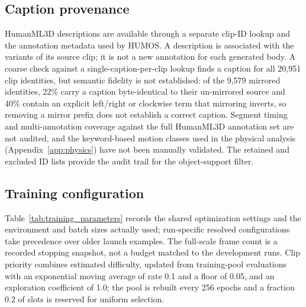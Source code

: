 \subsection{Caption provenance}\label{app:captions}

HumanML3D descriptions are available through a separate clip-ID lookup and the
annotation metadata used by HUMOS. A description is associated with the
variants of its source clip; it is not a new annotation for each generated body.
A coarse check against a single-caption-per-clip lookup finds a caption for all
20,951 clip identities, but semantic fidelity is not established: of the 9,579
mirrored identities, 22\% carry a caption byte-identical to their un-mirrored
source and 40\% contain an explicit left/right or clockwise term that mirroring
inverts, so removing a mirror prefix does not establish a correct caption.
Segment timing and multi-annotation coverage against the full HumanML3D
annotation set are not audited, and the keyword-based motion classes used in
the physical analysis (Appendix~\ref{app:physics}) have not been manually validated. The retained and
excluded ID lists provide the audit trail for the object-support filter.

\subsection{Training configuration}\label{app:training}

Table~\ref{tab:training_parameters} records the shared optimization settings and
the environment and batch sizes actually used; run-specific resolved
configurations take precedence over older launch examples. The full-scale frame
count is a recorded stopping snapshot, not a budget matched to the development
runs. Clip priority combines estimated difficulty, updated from training-pool
evaluations with an exponential moving average of rate 0.1 and a floor of 0.05,
and an exploration coefficient of 1.0; the pool is rebuilt every 256 epochs and
a fraction 0.2 of slots is reserved for uniform selection.

